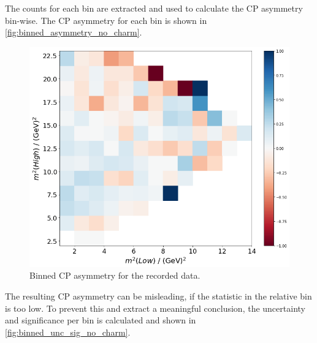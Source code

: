 The counts for each bin are extracted and used to calculate the CP asymmetry bin-wise. The CP asymmetry for each bin is shown in \autoref{fig:binned_asymmetry_no_charm}. 
\begin{figure}
  \centering
  \includegraphics[width = .45\textwidth]{"content/pics/binned_asymmetry_no_charm.png"}
  \caption{Binned CP asymmetry for the recorded data.}
  \label{fig:dalitz_real_ordered_nocharm}
\end{figure}
The resulting CP asymmetry can be misleading, if the statistic in the relative bin is too low. To prevent this and extract a meaningful conclusion, the uncertainty and significance per bin is calculated and shown in \autoref{fig:binned_unc_sig_no_charm}.
